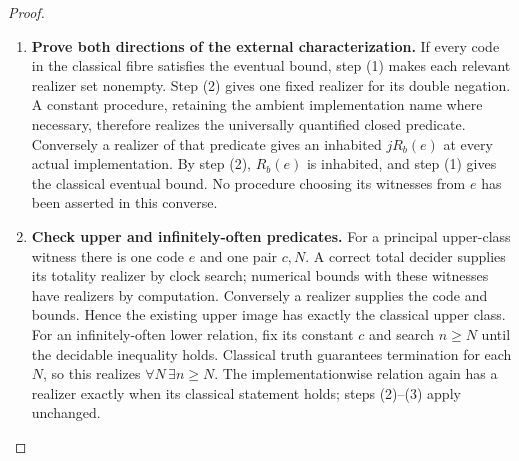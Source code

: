 \documentclass[11pt,a4paper]{article}
\numberwithin{algorithm}{section}
\numberwithin{equation}{section}
\theoremstyle{definition}
\theoremstyle{remark}
\theoremstyle{plain}
\theoremstyle{definition}
\theoremstyle{plain}
\begin{document}
\begin{proof}
\begin{enumerate}[leftmargin=*,align=left]
\item \textbf{Prove both directions of the external characterization.}
If every code in the classical fibre satisfies the eventual bound,
step (1) makes each relevant realizer set nonempty. Step (2) gives
one fixed realizer for its double negation. A constant procedure,
retaining the ambient implementation name where necessary, therefore
realizes the universally quantified closed predicate. Conversely a
realizer of that predicate gives an inhabited $jR_b(e)$ at every
actual implementation. By step (2), $R_b(e)$ is inhabited, and
step (1) gives the classical eventual bound. No procedure choosing
its witnesses from $e$ has been asserted in this converse.
\item \textbf{Check upper and infinitely-often predicates.}
For a principal upper-class witness there is one code $e$ and one pair
$c,N$. A correct total decider supplies its totality realizer by
clock search; numerical bounds with these witnesses have realizers
by computation. Conversely a realizer supplies the code and bounds.
Hence the existing upper image has exactly the classical upper class.
For an infinitely-often lower relation, fix its constant $c$ and
search $n\ge N$ until the decidable inequality holds. Classical
truth guarantees termination for each $N$, so this realizes
$\forall N\,\exists n\ge N$. The implementationwise relation
again has a realizer exactly when its classical statement holds;
steps (2)--(3) apply unchanged.
\end{enumerate}
\end{proof}
\end{document}
